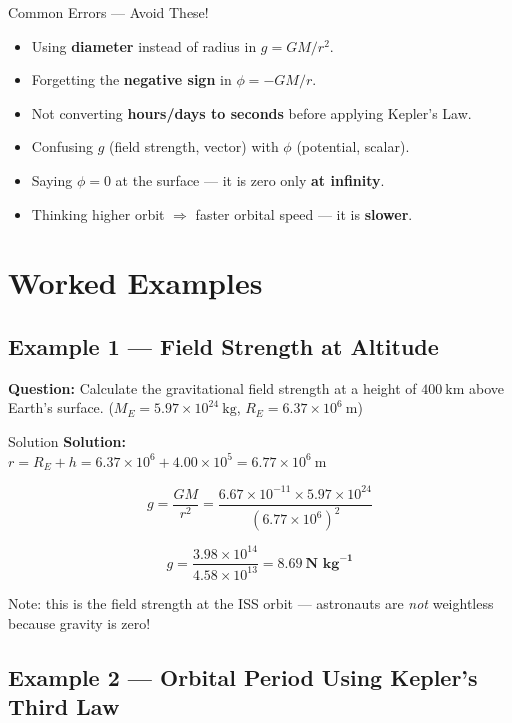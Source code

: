 \begin{warningbox}{Common Errors — Avoid These!}
\begin{itemize}[itemsep=3pt]
  \item Using \textbf{diameter} instead of radius in $g = GM/r^2$.
  \item Forgetting the \textbf{negative sign} in $\phi = -GM/r$.
  \item Not converting \textbf{hours/days to seconds} before applying Kepler's Law.
  \item Confusing \textbf{$g$} (field strength, vector) with \textbf{$\phi$} (potential, scalar).
  \item Saying $\phi = 0$ at the surface — it is zero only \textbf{at infinity}.
  \item Thinking higher orbit $\Rightarrow$ faster orbital speed — it is \textbf{slower}.
\end{itemize}
\end{warningbox}

\section{Worked Examples}

\subsection*{Example 1 — Field Strength at Altitude}

\textbf{Question:} Calculate the gravitational field strength at a height of $400\ \text{km}$ above Earth's surface. ($M_E = 5.97\times10^{24}\ \text{kg}$, $R_E = 6.37\times10^6\ \text{m}$)

\begin{examplebox}{Solution}
\textbf{Solution:}\\
$r = R_E + h = 6.37\times10^6 + 4.00\times10^5 = 6.77\times10^6\ \text{m}$

$$g = \frac{GM}{r^2} = \frac{6.67\times10^{-11} \times 5.97\times10^{24}}{(6.77\times10^6)^2}$$

$$g = \frac{3.98\times10^{14}}{4.58\times10^{13}} = \mathbf{8.69\ \text{N kg}^{-1}}$$

Note: this is the field strength at the ISS orbit — astronauts are \emph{not} weightless because gravity is zero!
\end{examplebox}

\subsection*{Example 2 — Orbital Period Using Kepler's Third Law}

